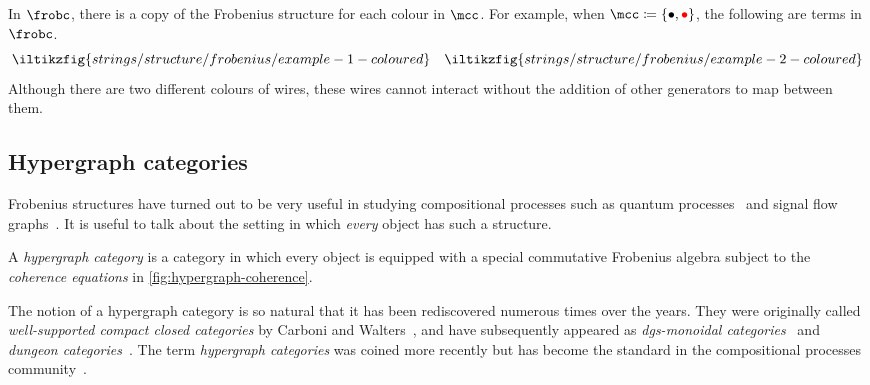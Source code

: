 \begin{example}
    In \(\frobc\), there is a copy of the Frobenius structure for each colour
    in \(\mcc\).
    For example, when \(\mcc \coloneqq \{\bullet,\redbullet\}\), the following
    are terms in \(\frobc\).
    \[
        \iltikzfig{strings/structure/frobenius/example-1-coloured}
        \quad
        \iltikzfig{strings/structure/frobenius/example-2-coloured}
    \]
    Although there are two different colours of wires, these wires cannot
    interact without the addition of other generators to map between them.
\end{example}


\subsection{Hypergraph categories}

Frobenius structures have turned out to be very useful in studying compositional
processes such as quantum processes~\cite{coecke2008interacting} and signal flow
graphs~\cite{bonchi2014categorical,bonchi2015full}.
It is useful to talk about the setting in which \emph{every} object has such a
structure.

\begin{definition}
    \label{def:hypergraph-category}
    A \emph{hypergraph category} is a category in which every object is equipped
    with a special commutative Frobenius algebra subject to the
    \emph{coherence equations} in \cref{fig:hypergraph-coherence}.
\end{definition}



\begin{remark}
    The notion of a hypergraph category is so natural that it has been
    rediscovered numerous times over the years.
    They were originally called \emph{well-supported compact closed categories}
    by Carboni and Walters~\cite{carboni1987cartesian}, and have subsequently
    appeared as
    \emph{dgs-monoidal categories}~\cite{katis1997bicategories,gadducci1998inductive,gadducci1999bicategorical,bruni2002normal}
    and \emph{dungeon categories}~\cite{morton2014belief}.
    The term \emph{hypergraph categories} was coined more recently but has
    become the standard in the compositional processes
    community~\cite{kissinger2015finite,fong2015decorated,baez2016compositional,baez2018compositional}.
\end{remark}

